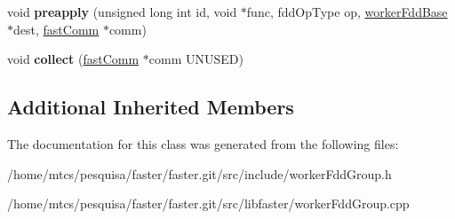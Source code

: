 \begin{DoxyCompactItemize}
\item 
\hypertarget{classfaster_1_1workerFddGroup_a40ff7dd73c6fef3a6c6496ea22e30f0f}{}void {\bfseries preapply} (unsigned long int id, void $\ast$func, fdd\+Op\+Type op, \hyperlink{classfaster_1_1workerFddBase}{worker\+Fdd\+Base} $\ast$dest, \hyperlink{classfaster_1_1fastComm}{fast\+Comm} $\ast$comm)\label{classfaster_1_1workerFddGroup_a40ff7dd73c6fef3a6c6496ea22e30f0f}

\item 
\hypertarget{classfaster_1_1workerFddGroup_a59914c39f0345e48932a1ae682efd107}{}void {\bfseries collect} (\hyperlink{classfaster_1_1fastComm}{fast\+Comm} $\ast$comm U\+N\+U\+S\+E\+D)\label{classfaster_1_1workerFddGroup_a59914c39f0345e48932a1ae682efd107}

\end{DoxyCompactItemize}
\subsection*{Additional Inherited Members}


The documentation for this class was generated from the following files\+:\begin{DoxyCompactItemize}
\item 
/home/mtcs/pesquisa/faster/faster.\+git/src/include/worker\+Fdd\+Group.\+h\item 
/home/mtcs/pesquisa/faster/faster.\+git/src/libfaster/worker\+Fdd\+Group.\+cpp\end{DoxyCompactItemize}
